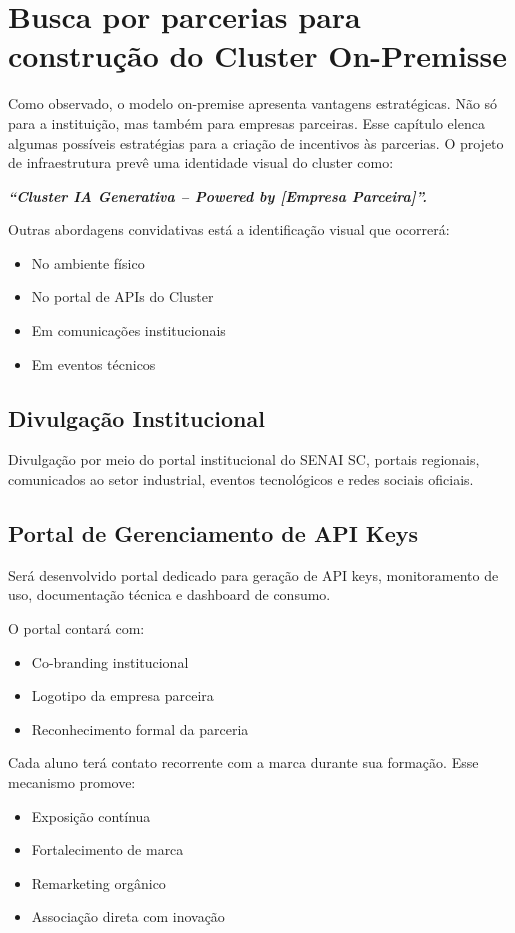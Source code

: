 \documentclass[12pt,a4paper,]{abntex2}
\begin{document}
\chapter{Busca por parcerias para construção do Cluster On-Premisse}

Como observado, o modelo on-premise apresenta vantagens estratégicas. Não só para a instituição, mas também para empresas parceiras. 
Esse capítulo elenca algumas possíveis estratégias para a criação de incentivos às parcerias.
O projeto de infraestrutura prevê uma identidade visual do cluster como:

\textbf{\textit{“Cluster IA Generativa – Powered by [Empresa Parceira]”.}}

Outras abordagens convidativas está a identificação visual que ocorrerá:
\begin{itemize}
\item No ambiente físico
\item No portal de APIs do Cluster
\item Em comunicações institucionais
\item Em eventos técnicos
\end{itemize}

\section{Divulgação Institucional}

Divulgação por meio do portal institucional do SENAI SC, portais regionais, comunicados ao setor industrial, eventos tecnológicos e redes sociais oficiais.

\section{Portal de Gerenciamento de API Keys}

Será desenvolvido portal dedicado para geração de API keys, monitoramento de uso, documentação técnica e dashboard de consumo.

O portal contará com:
\begin{itemize}
\item Co-branding institucional
\item Logotipo da empresa parceira
\item Reconhecimento formal da parceria
\end{itemize}

Cada aluno terá contato recorrente com a marca durante sua formação.
Esse mecanismo promove:
\begin{itemize}
    \item Exposição contínua
    \item Fortalecimento de marca
    \item Remarketing orgânico
    \item Associação direta com inovação
\end{itemize}
\end{document}
